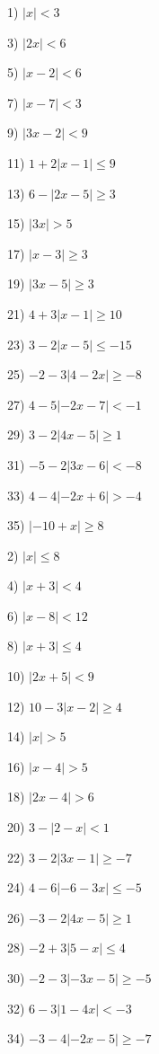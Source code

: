 \documentclass[11pt]{book}
\theoremstyle{definition}  %
\begin{document}
\begin{multicols}{2}
  1) $| x | < 3$
  
  3) $| 2 x| < 6$
  
  5) $| x - 2| < 6$
  
  7) $|x - 7| < 3$
  
  9) $|3x - 2| < 9$
  
  11) $1 + 2 |x - 1| \leq 9$
  
  13) $6 - |2x - 5| \geq 3$
  
  15) $|3x| > 5$
  
  17) $| x - 3| \geq 3$
  
  19) $| 3 x - 5| \geq 3$
  
  21) $4 + 3 |x - 1| \geq 10$
  
  23) $3 - 2 |x - 5| \leq - 15$
  
  25) $- 2 - 3 |4 - 2 x| \geq - 8$
  
  27) $4 - 5| - 2 x - 7| < - 1$
  
  29) $3 - 2 |4x - 5| \geq 1$
  
  31) $- 5 - 2 |3x - 6| < - 8$
  
  33) $4 - 4| - 2 x + 6| > - 4$
  
  35) $| - 10 + x | \geq 8$
  
  2) $| x | \leq 8$
  
  4) $| x + 3| < 4$
  
  6) $|x - 8| < 12$
  
  8) $|x + 3| \leq 4$
  
  10) $|2x + 5| < 9$
  
  12) $10 - 3 |x - 2| \geq 4$
  
  14) $|x| > 5$
  
  16) $| x - 4| > 5$
  
  18) $| 2 x - 4| > 6$
  
  20) $3 - |2 - x| < 1$
  
  22) $3 - 2 |3x - 1| \geq - 7$
  
  24) $4 - 6| - 6 - 3 x| \leq - 5$
  
  26) $- 3 - 2 |4x - 5| \geq 1$
  
  28) $- 2 + 3 |5 - x| \leq 4$
  
  30) $- 2 - 3| - 3 x - 5| \geq - 5$
  
  32) $6 - 3 |1 - 4 x| < - 3$
  
  34) $- 3 - 4| - 2 x - 5| \geq - 7$
  
\end{multicols}
\end{document}
